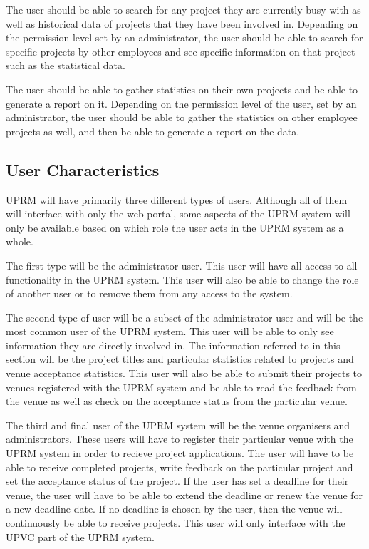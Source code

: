 		The user should be able to search for any project they are currently busy with as well as historical data of projects that they have been involved in. Depending on the permission level set by an administrator, the user should be able to search for specific projects by other employees and see specific information on that project such as the statistical data.
		
		The user should be able to gather statistics on their own projects and be able to generate a report on it. Depending on the permission level of the user, set by an administrator, the user should be able to gather the statistics on other employee projects as well, and then be able to generate a report on the data.
	
	\subsection{User Characteristics}
		UPRM will have primarily three different types of users. Although all of them will interface with only the web portal, some aspects of the UPRM system will only be available based on which role the user acts in the UPRM system as a whole.
		
		The first type will be the administrator user. This user will have all access to all functionality in the UPRM system. This user will also be able to change the role of another user or to remove them from any access to the system.
		
		The second type of user will be a subset of the administrator user and will be the most common user of the UPRM system. This user will be able to only see information they are directly involved in. The information referred to in this section will be the project titles and particular statistics related to projects and venue acceptance statistics. This user will also be able to submit their projects to venues registered with the UPRM system and be able to read the feedback from the venue as well as check on the acceptance status from the particular venue.
		
		The third and final user of the UPRM system will be the venue organisers and administrators. These users will have to register their particular venue with the UPRM system in order to recieve project applications. The user will have to be able to receive completed projects, write feedback on the particular project and set the acceptance status of the project. If the user has set a deadline for their venue, the user will have to be able to extend the deadline or renew the venue for a new deadline date. If no deadline is chosen by the user, then the venue will continuously be able to receive projects. This user will only interface with the UPVC part of the UPRM system.
	
